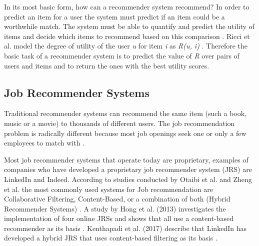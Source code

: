 In its most basic form, how can a recommender system recommend? 
In order to predict an item for a user the system must predict if an item could be a worthwhile match. 
The system must be able to quantify and predict the utility of items and decide which items to recommend based on this comparison \cite{2015RecommenderHandbook}. 
Ricci et al. model the degree of utility of the user \textit{u} for item \textit{i} as \textit{R(u, i)} \cite{Ricci2018RecommenderTechniques}. 
Therefore the basic task of a recommender system is to predict the value of \textit{R} over pairs of users and items and to return the ones with the best utility scores.

\subsection{Job Recommender Systems}
\label{sec:jrs}
Traditional recommender systems can recommend the same item (such a book, music or a movie) to thousands of different users. 
The job recommendation problem is radically different because most job openings seek one or only a few employees to match with \cite{kenthapadi2017personalized}.

Most job recommender systems that operate today are proprietary, examples of companies who have developed a proprietary job recommender system (JRS) are LinkedIn and Indeed.
According to studies conducted by Otaibi et al. and Zheng et al. the most commonly used  systems for Job recommendation are Collaborative Filtering, Content-Based, or a combination of both (Hybrid Recommender Systems) \cite{T.Al-Otaibi2012ASystems} \cite{Zheng2012JobSurvey}.
A study by Hong et al. (2013) investigates the implementation of four online JRSs and shows that all use a content-based recommender as its basis \cite{hong2013job}.
Kenthapadi et al. (2017) describe that LinkedIn has developed a hybrid JRS that uses content-based filtering as its basis \cite{kenthapadi2017personalized}.

